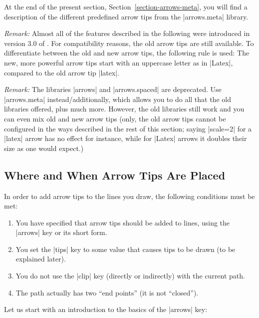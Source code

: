 At the end of the present section, Section~\ref{section-arrows-meta}, you will
find a description of the different predefined arrow tips from the
|arrows.meta| library.

\emph{Remark:} Almost all of the features described in the following were
introduced in version 3.0 of \tikzname. For compatibility reasons, the old
arrow tips are still available. To differentiate between the old and new arrow
tips, the following rule is used: The new, more powerful arrow tips start with
an uppercase letter as in |Latex|, compared to the old arrow tip |latex|.

\emph{Remark:} The libraries |arrows| and |arrows.spaced| are deprecated. Use
|arrows.meta| instead/additionally, which allows you to do all that the old
libraries offered, plus much more. However, the old libraries still work and
you can even mix old and new arrow tips (only, the old arrow tips cannot be
configured in the ways described in the rest of this section; saying |scale=2|
for a |latex| arrow has no effect for instance, while for |Latex| arrows it
doubles their size as one would expect.)


\subsection{Where and When Arrow Tips Are Placed}
\label{section-arrow-tips-where}

In order to add arrow tips to the lines you draw, the following conditions must
be met:
%
\begin{enumerate}
    \item You have specified that arrow tips should be added to lines, using
        the |arrows| key or its short form.
    \item You set the |tips| key to some value that causes tips to be drawn
        (to be explained later).
    \item You do not use the |clip| key (directly or indirectly) with the
        current path.
    \item The path actually has two ``end points'' (it is not ``closed'').
\end{enumerate}

Let us start with an introduction to the basics of the |arrows| key:

